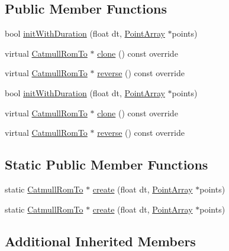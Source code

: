 \subsection*{Public Member Functions}
\begin{DoxyCompactItemize}
\item 
bool \hyperlink{classCatmullRomTo_aa7097d8400b43f18d9abcda9fad887fa}{init\+With\+Duration} (float dt, \hyperlink{classPointArray}{Point\+Array} $\ast$points)
\item 
virtual \hyperlink{classCatmullRomTo}{Catmull\+Rom\+To} $\ast$ \hyperlink{classCatmullRomTo_ac06c19763c7b07903f19178f94694541}{clone} () const override
\item 
virtual \hyperlink{classCatmullRomTo}{Catmull\+Rom\+To} $\ast$ \hyperlink{classCatmullRomTo_ac3a4e10bb0ce746fc0dc76d804482bc3}{reverse} () const override
\item 
bool \hyperlink{classCatmullRomTo_aa7097d8400b43f18d9abcda9fad887fa}{init\+With\+Duration} (float dt, \hyperlink{classPointArray}{Point\+Array} $\ast$points)
\item 
virtual \hyperlink{classCatmullRomTo}{Catmull\+Rom\+To} $\ast$ \hyperlink{classCatmullRomTo_afa8df104554278343334dfa497cc1526}{clone} () const override
\item 
virtual \hyperlink{classCatmullRomTo}{Catmull\+Rom\+To} $\ast$ \hyperlink{classCatmullRomTo_a4657e8372500bbf9faa339cde93d1610}{reverse} () const override
\end{DoxyCompactItemize}
\subsection*{Static Public Member Functions}
\begin{DoxyCompactItemize}
\item 
static \hyperlink{classCatmullRomTo}{Catmull\+Rom\+To} $\ast$ \hyperlink{classCatmullRomTo_a8bd98d010b26d17f96baa9b21b7ebd8e}{create} (float dt, \hyperlink{classPointArray}{Point\+Array} $\ast$points)
\item 
static \hyperlink{classCatmullRomTo}{Catmull\+Rom\+To} $\ast$ \hyperlink{classCatmullRomTo_a2aef004ee68f0a2683d12a89fd88696e}{create} (float dt, \hyperlink{classPointArray}{Point\+Array} $\ast$points)
\end{DoxyCompactItemize}
\subsection*{Additional Inherited Members}


